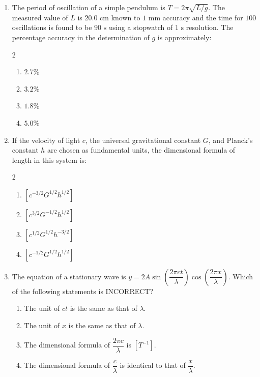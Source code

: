 \documentclass[11pt,a4paper]{article}
\begin{document}
\begin{enumerate}[label=\textbf{\textcolor{l2Amber}{Q\arabic*.}},leftmargin=24pt,itemsep=10pt,start=26]
  \item The period of oscillation of a simple pendulum is $T = 2\pi\sqrt{L/g}$. The measured value of $L$ is $20.0\text{ cm}$ known to $1\text{ mm}$ accuracy and the time for $100$ oscillations is found to be $90\text{ s}$ using a stopwatch of $1\text{ s}$ resolution. The percentage accuracy in the determination of $g$ is approximately:
  \begin{multicols}{2}
  \begin{enumerate}[label=\textbf{\textcolor{primaryDark}{(\Alph*)}},itemsep=2pt]
    \item $2.7\%$
    \item $3.2\%$
    \item $1.8\%$
    \item $5.0\%$
  \end{enumerate}
  \end{multicols}

  \item If the velocity of light $c$, the universal gravitational constant $G$, and Planck's constant $h$ are chosen as fundamental units, the dimensional formula of length in this system is:
  \begin{multicols}{2}
  \begin{enumerate}[label=\textbf{\textcolor{primaryDark}{(\Alph*)}},itemsep=2pt]
    \item $[c^{-3/2} G^{1/2} h^{1/2}]$
    \item $[c^{3/2} G^{-1/2} h^{1/2}]$
    \item $[c^{1/2} G^{1/2} h^{-3/2}]$
    \item $[c^{-1/2} G^{1/2} h^{1/2}]$
  \end{enumerate}
  \end{multicols}

  \item The equation of a stationary wave is $y = 2A \sin\left(\dfrac{2\pi ct}{\lambda}\right) \cos\left(\dfrac{2\pi x}{\lambda}\right)$. Which of the following statements is INCORRECT?
  \begin{enumerate}[label=\textbf{\textcolor{primaryDark}{(\Alph*)}},itemsep=2pt]
    \item The unit of $ct$ is the same as that of $\lambda$.
    \item The unit of $x$ is the same as that of $\lambda$.
    \item The dimensional formula of $\dfrac{2\pi c}{\lambda}$ is $[T^{-1}]$.
    \item The dimensional formula of $\dfrac{c}{\lambda}$ is identical to that of $\dfrac{x}{\lambda}$.
  \end{enumerate}


\end{enumerate}
\end{document}
